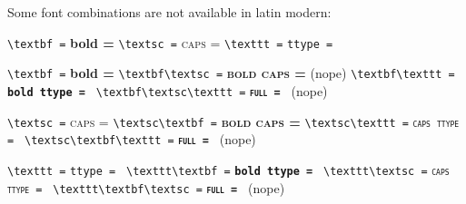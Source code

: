 \documentclass{article}
\begin{document}


\setlength{\parindent}{0pt}
\obeylines

Some font combinations are not available in latin modern:
\bigskip

\verb`\textbf =` \textbf{bold = \fontname\font}
\verb`\textsc =` \textsc{caps = \fontname\font}
\verb`\texttt =` \texttt{ttype = \fontname\font}

\bigskip
\verb`\textbf =` \textbf{bold = \fontname\font}
\verb`\textbf\textsc =` \textbf{\textsc{bold caps = \fontname\font}} (nope)
\verb`\textbf\texttt =` \textbf{\texttt{bold ttype = \fontname\font}}
\verb`\textbf\textsc\texttt =` \textbf{\textsc{\texttt{full = \fontname\font}}} (nope)

\bigskip
\verb`\textsc =` \textsc{caps = \fontname\font}
\verb`\textsc\textbf =` \textsc{\textbf{bold caps = \fontname\font}}
\verb`\textsc\texttt =` \textsc{\texttt{caps ttype = \fontname\font}}
\verb`\textsc\textbf\texttt =` \textsc{\textbf{\texttt{full = \fontname\font}}} (nope)

\bigskip
\verb`\texttt =` \texttt{ttype = \fontname\font}
\verb`\texttt\textbf =` \texttt{\textbf{bold ttype = \fontname\font}}
\verb`\texttt\textsc =` \texttt{\textsc{caps ttype = \fontname\font}}
\verb`\texttt\textbf\textsc =` \texttt{\textbf{\textsc{full = \fontname\font}}} (nope)
\end{document}
